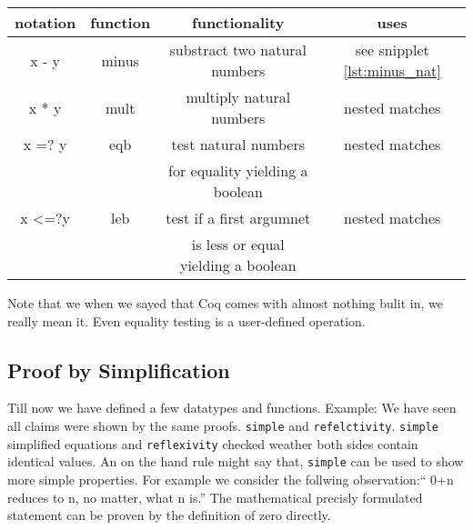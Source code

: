    \begin{center}
   \begin{tabular}{|c|c|c|c|}
     \hline 
 	  notation      & function        & functionality                       & uses           \\  \hline
 	  x - y         & minus           & substract two natural numbers       & see snipplet \ref{lst:minus_nat} \\  \hline
      x * y         & mult            & multiply natural numbers            & nested matches \\  \hline   
   	  x =? y        & eqb             & test natural numbers                & nested matches \\  
  	                &                 & for equality yielding a boolean     &                \\  \hline
   	  x <=?y        & leb             & test if a first argumnet            & nested matches \\  
   	                &                 & is less or equal yielding a boolean &                \\  \hline
   	 \hline
   \end{tabular}
   \end{center}
	Note that we when we sayed that Coq comes with almost nothing bulit in, we really mean it.
    Even equality testing is a user-defined operation.    
   \subsection{Proof by Simplification}
   
   
   Till now we have defined a few datatypes and functions.
   Example: We have seen all claims were shown by the same proofs. \lstinline!simple! and \lstinline!refelctivity!. 
   \lstinline!simple! simplified equations and \lstinline!reflexivity! checked weather both sides contain identical values.
   An on the hand rule might say that, \lstinline!simple! can be used to show more simple properties.
   For example we consider the follwing observation:`` 0+n reduces to n, no matter, what n is.''
   The mathematical precisly formulated statement can be proven by the definition of zero directly.
   
